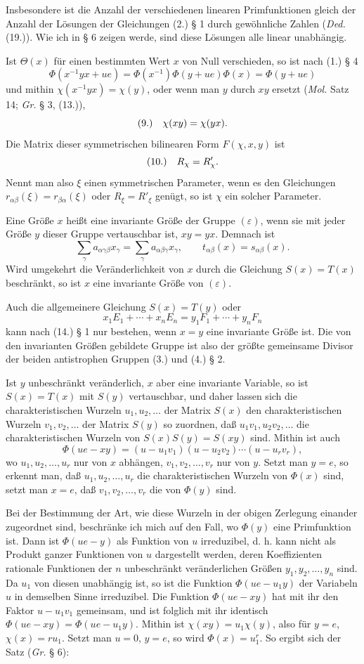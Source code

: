 \documentclass[11pt]{article}
\newcommand{\eps}{\varepsilon}
\newcommand{\fnum}[1]{\textup{(\ensuremath{#1}.)}\quad}
\begin{document}
Insbesondere ist die Anzahl der verschiedenen linearen Primfunktionen gleich der Anzahl der Lösungen der Gleichungen (2.) § 1 durch gewöhnliche Zahlen (\emph{Ded.} (19.)). Wie ich in § 6 zeigen werde, sind diese Lösungen alle linear unabhängig.

Ist $\Theta(x)$ für einen bestimmten Wert $x$ von Null verschieden, so ist nach (1.) § 4
\[
 \Phi(x^{-1}yx+ue)=\Phi(x^{-1})\Phi(y+ue)\Phi(x)=\Phi(y+ue)
\]
und mithin $\chi(x^{-1}yx)=\chi(y)$, oder wenn man $y$ durch $xy$ ersetzt (\emph{Mol.} Satz 14; \emph{Gr.} § 3, (13.)),
\[
\fnum{9} \chi(xy)=\chi(yx).
\]
Die Matrix dieser symmetrischen bilinearen Form $F(\chi,x,y)$ ist
\[
\fnum{10} R_\chi=R'_\chi.
\]
Nennt man also $\xi$ einen symmetrischen Parameter, wenn es den Gleichungen $r_{\alpha\beta}(\xi)=r_{\beta\alpha}(\xi)$ oder $R_\xi=R'_\xi$ genügt, so ist $\chi$ ein solcher Parameter.

Eine Größe $x$ heißt eine invariante Größe der Gruppe $(\eps)$, wenn sie mit jeder Größe $y$ dieser Gruppe vertauschbar ist, $xy=yx$. Demnach ist
\[
 \sum_\gamma a_{\alpha\gamma\beta}x_\gamma=\sum_\gamma a_{\alpha\beta\gamma}x_\gamma,\qquad
 t_{\alpha\beta}(x)=s_{\alpha\beta}(x).
\]
Wird umgekehrt die Veränderlichkeit von $x$ durch die Gleichung $S(x)=T(x)$ beschränkt, so ist $x$ eine invariante Größe von $(\eps)$.

Auch die allgemeinere Gleichung $S(x)=T(y)$ oder
\[
 x_1E_1+\cdots+x_nE_n=y_1F_1+\cdots+y_nF_n
\]
kann nach (14.) § 1 nur bestehen, wenn $x=y$ eine invariante Größe ist. Die von den invarianten Größen gebildete Gruppe ist also der größte gemeinsame Divisor der beiden antistrophen Gruppen (3.) und (4.) § 2.

Ist $y$ unbeschränkt veränderlich, $x$ aber eine invariante Variable, so ist $S(x)=T(x)$ mit $S(y)$ vertauschbar, und daher lassen sich die charakteristischen Wurzeln $u_1,u_2,\ldots$ der Matrix $S(x)$ den charakteristischen Wurzeln $v_1,v_2,\ldots$ der Matrix $S(y)$ so zuordnen, daß $u_1v_1,u_2v_2,\ldots$ die charakteristischen Wurzeln von $S(x)S(y)=S(xy)$ sind. Mithin ist auch
\[
 \Phi(ue-xy)=(u-u_1v_1)(u-u_2v_2)\cdots(u-u_rv_r),
\]
wo $u_1,u_2,\ldots,u_r$ nur von $x$ abhängen, $v_1,v_2,\ldots,v_r$ nur von $y$. Setzt man $y=e$, so erkennt man, daß $u_1,u_2,\ldots,u_r$ die charakteristischen Wurzeln von $\Phi(x)$ sind, setzt man $x=e$, daß $v_1,v_2,\ldots,v_r$ die von $\Phi(y)$ sind.

Bei der Bestimmung der Art, wie diese Wurzeln in der obigen Zerlegung einander zugeordnet sind, beschränke ich mich auf den Fall, wo $\Phi(y)$ eine Primfunktion ist. Dann ist $\Phi(ue-y)$ als Funktion von $u$ irreduzibel, d. h. kann nicht als Produkt ganzer Funktionen von $u$ dargestellt werden, deren Koeffizienten rationale Funktionen der $n$ unbeschränkt veränderlichen Größen $y_1,y_2,\ldots,y_n$ sind. Da $u_1$ von diesen unabhängig ist, so ist die Funktion $\Phi(ue-u_1y)$ der Variabeln $u$ in demselben Sinne irreduzibel. Die Funktion $\Phi(ue-xy)$ hat mit ihr den Faktor $u-u_1v_1$ gemeinsam, und ist folglich mit ihr identisch $\Phi(ue-xy)=\Phi(ue-u_1y)$. Mithin ist $\chi(xy)=u_1\chi(y)$, also für $y=e$, $\chi(x)=ru_1$. Setzt man $u=0$, $y=e$, so wird $\Phi(x)=u_1^r$. So ergibt sich der Satz (\emph{Gr.} § 6):
\end{document}
